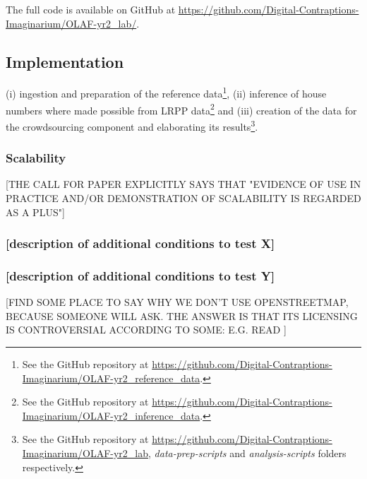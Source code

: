 The full code is available on GitHub at \url{https://github.com/Digital-Contraptions-Imaginarium/OLAF-yr2_lab/}.

\subsection{Implementation}


(i) ingestion and preparation of the reference data\footnote{See the GitHub repository at \url{https://github.com/Digital-Contraptions-Imaginarium/OLAF-yr2_reference_data}.}, (ii) inference of house numbers where made possible from LRPP data\footnote{See the GitHub repository at \url{https://github.com/Digital-Contraptions-Imaginarium/OLAF-yr2_inference_data}.} and (iii) creation of the data for the crowdsourcing component and elaborating its results\footnote{See the GitHub repository at \url{https://github.com/Digital-Contraptions-Imaginarium/OLAF-yr2_lab}, {\it data-prep-scripts} and {\it analysis-scripts} folders respectively.}. 


    	
    \subsubsection{Scalability}
    
        [THE CALL FOR PAPER EXPLICITLY SAYS THAT "EVIDENCE OF USE IN PRACTICE AND/OR DEMONSTRATION OF SCALABILITY IS REGARDED AS A PLUS"]
    
    \subsubsection{{[}description of additional conditions to test X{]}}
    \subsubsection{{[}description of additional conditions to test Y{]}}

[FIND SOME PLACE TO SAY WHY WE DON'T USE OPENSTREETMAP, BECAUSE SOMEONE WILL ASK. THE ANSWER IS THAT ITS LICENSING IS CONTROVERSIAL ACCORDING TO SOME: E.G. READ \cite{CentreforSpatialLawandPolicy:2014tx}]
    

